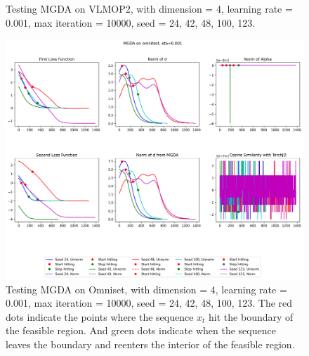 \documentclass{article}
\renewcommand{\|}{\biggr|}
\begin{document}
\begin{center}
\begin{figure}[h]
            \caption{Testing MGDA on VLMOP2, with dimension = 4, learning rate = 0.001, max iteration = 10000, seed = 24, 42, 48, 100, 123.}
        \end{figure}
        \begin{figure}[h]
            \includegraphics[scale=0.4]{MGDA_omnitest.png}
            \caption{Testing MGDA on Omniset, with dimension = 4, learning rate = 0.001, max iteration = 10000, seed = 24, 42, 48, 100, 123. The red dots indicate the points where the sequence $x_t$ hit the boundary of the feasible region. And green dots indicate when the sequence leaves the boundary and reenters the interior of the feasible region.}
        \end{figure}
    \end{center}
\end{document}
